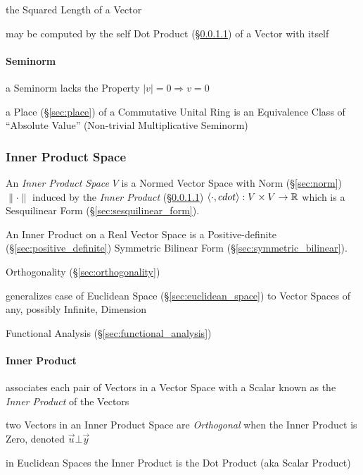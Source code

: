 the Squared Length of a Vector

may be computed by the self Dot Product (\S\ref{sec:inner_product}) of a Vector
with itself



\paragraph{Seminorm}\label{sec:seminorm}\hfill

a Seminorm lacks the Property $|v| = 0 \Longrightarrow v = 0$

\fist a Place (\S\ref{sec:place}) of a Commutative Unital Ring is an
Equivalence Class of ``Absolute Value'' (Non-trivial Multiplicative Seminorm)



\subsubsection{Inner Product Space}\label{sec:innerproduct_space}

An \emph{Inner Product Space} $V$ is a Normed Vector Space with Norm
(\S\ref{sec:norm}) $\|\cdot\|$ induced by the \emph{Inner Product}
(\S\ref{sec:inner_product}) $\langle{\cdot,cdot}\rangle : V \times V
\rightarrow \mathbb{R}$ which is a Sesquilinear Form
(\S\ref{sec:sesquilinear_form}).

An Inner Product on a Real Vector Space is a Positive-definite
(\S\ref{sec:positive_definite}) Symmetric Bilinear Form
(\S\ref{sec:symmetric_bilinear}).

\fist Orthogonality (\S\ref{sec:orthogonality})

generalizes case of Euclidean Space (\S\ref{sec:euclidean_space}) to
Vector Spaces of any, possibly Infinite, Dimension

Functional Analysis (\S\ref{sec:functional_analysis})



\paragraph{Inner Product}\label{sec:inner_product}\hfill

associates each pair of Vectors in a Vector Space with a Scalar known
as the \emph{Inner Product} of the Vectors

two Vectors in an Inner Product Space are \emph{Orthogonal} when the Inner
Product is Zero, denoted $\vec{u} \bot \vec{y}$

in Euclidean Spaces the Inner Product is the Dot Product (aka Scalar Product)

